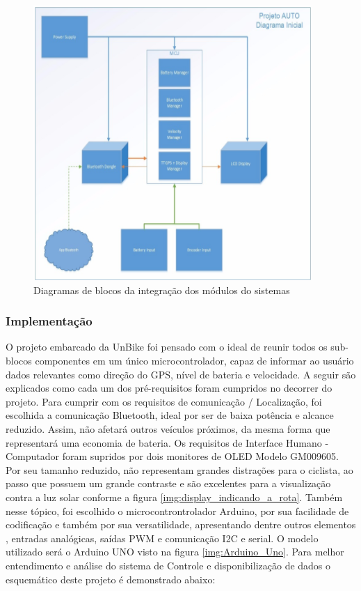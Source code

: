  			\graphicspath{{figuras/}}
 			\begin{figure}[h!]
 				\centering
 				\includegraphics[scale=1.4]{Figura6_Diagrama_de_modulos_do_sistema.PNG}
 				\caption{Diagramas de blocos da integração dos módulos do sistemas}
 				\label{img:Diagrama_de_modulos_do_sistema}
 			\end{figure}
 		 		
		\subsubsection{Implementação}
		O projeto embarcado da UnBike foi pensado com o ideal de reunir todos os sub-blocos componentes em um único microcontrolador, capaz de informar ao usuário dados relevantes como direção do GPS, nível de bateria e velocidade. A seguir são explicados como cada um dos pré-requisitos foram cumpridos no decorrer do projeto.
		Para cumprir com os requisitos de  comunicação / Localização, foi escolhida a comunicação Bluetooth, ideal por ser de baixa potência e alcance reduzido. Assim, não afetará outros veículos próximos, da mesma forma que representará uma economia de bateria. 
		Os requisitos de Interface Humano - Computador foram supridos por dois monitores de OLED Modelo GM009605. Por seu tamanho reduzido, não representam grandes distrações para o ciclista, ao passo que possuem um grande contraste e são excelentes para a visualização contra a luz solar conforme a figura \ref{img:display_indicando_a_rota}. Também nesse tópico, foi escolhido o microcontrontrolador Arduino, por sua facilidade de codificação e também por sua versatilidade, apresentando dentre outros elementos , entradas analógicas, saídas PWM e comunicação I2C e serial. O modelo utilizado será o Arduino UNO visto na figura \ref{img:Arduino_Uno}.
		Para melhor entendimento e análise do sistema de Controle e disponibilização de dados o esquemático deste projeto é demonstrado abaixo:
		\newpage
		
